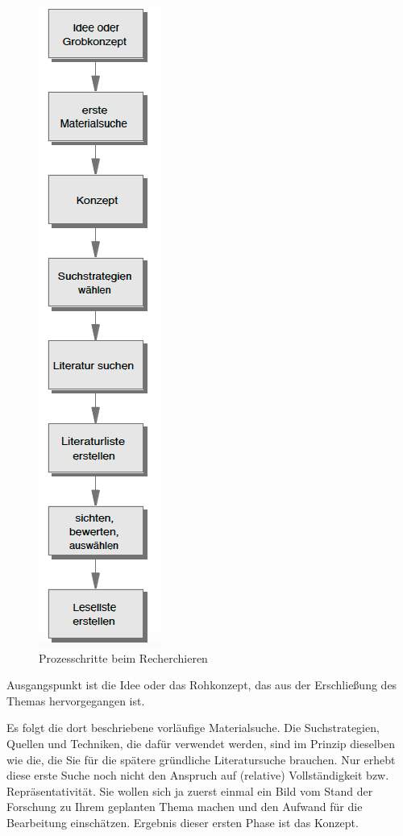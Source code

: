 \documentclass[]{book}
\theoremstyle{definition}
\theoremstyle{definition}
\theoremstyle{definition}
\theoremstyle{remark}
\begin{document}
\begin{figure}

{\centering \includegraphics{images/recherchieren-ablauf-min} 

}

\caption{Prozesschritte beim Recherchieren}\label{fig:unnamed-chunk-4}
\end{figure}

Ausgangspunkt ist die Idee oder das Rohkonzept, das aus der Erschließung
des Themas hervorgegangen ist.

Es folgt die dort beschriebene vorläufige Materialsuche. Die
Suchstrategien, Quellen und Techniken, die dafür verwendet werden, sind
im Prinzip dieselben wie die, die Sie für die spätere gründliche
Literatursuche brauchen. Nur erhebt diese erste Suche noch nicht den
Anspruch auf (relative) Vollständigkeit bzw. Repräsentativität. Sie
wollen sich ja zuerst einmal ein Bild vom Stand der Forschung zu Ihrem
geplanten Thema machen und den Aufwand für die Bearbeitung einschätzen.
Ergebnis dieser ersten Phase ist das Konzept.
\end{document}
